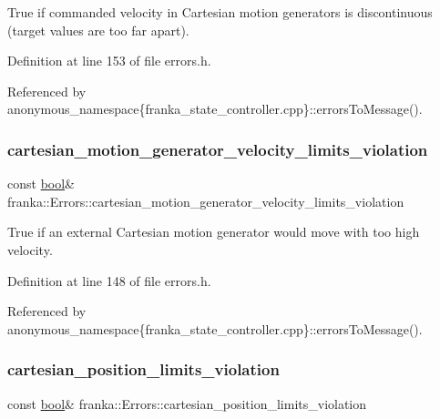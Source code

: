 True if commanded velocity in Cartesian motion generators is discontinuous (target values are too far apart). 

Definition at line 153 of file errors.\+h.



Referenced by anonymous\+\_\+namespace\{franka\+\_\+state\+\_\+controller.\+cpp\}\+::errors\+To\+Message().

\mbox{\label{structfranka_1_1Errors_a91437c081452ef708563346b102ba894}} 
\subsubsection{\texorpdfstring{cartesian\+\_\+motion\+\_\+generator\+\_\+velocity\+\_\+limits\+\_\+violation}{cartesian\_motion\_generator\_velocity\_limits\_violation}}
{\footnotesize\ttfamily const \hyperlink{classbool}{bool}\& franka\+::\+Errors\+::cartesian\+\_\+motion\+\_\+generator\+\_\+velocity\+\_\+limits\+\_\+violation}

True if an external Cartesian motion generator would move with too high velocity. 

Definition at line 148 of file errors.\+h.



Referenced by anonymous\+\_\+namespace\{franka\+\_\+state\+\_\+controller.\+cpp\}\+::errors\+To\+Message().

\mbox{\label{structfranka_1_1Errors_a41c8b50ecbb015a2dba1a3dbbff694b6}} 
\subsubsection{\texorpdfstring{cartesian\+\_\+position\+\_\+limits\+\_\+violation}{cartesian\_position\_limits\_violation}}
{\footnotesize\ttfamily const \hyperlink{classbool}{bool}\& franka\+::\+Errors\+::cartesian\+\_\+position\+\_\+limits\+\_\+violation}

